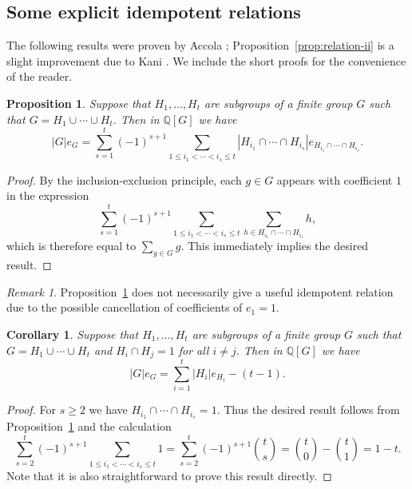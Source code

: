 \documentclass[12pt]{amsart}
\theoremstyle{plain}
\newtheorem{corollary}[theorem]{Corollary}
\newtheorem{prop}[theorem]{Proposition}
\theoremstyle{remark}
\newtheorem{remark}[theorem]{Remark}
\theoremstyle{definition}
\newcommand{\Q}{\mathbb{Q}}
\numberwithin{equation}{section}
\begin{document}
\subsection{Some explicit idempotent relations}\label{subsec:explicit-ir}
The following results were proven by Accola \cite{MR0259105};
Proposition~\ref{prop:relation-ii} is a slight improvement due to Kani \cite[\S 3]{MR790953}.
We include the short proofs for the convenience of the reader. 

\begin{prop}\cite{MR0259105}\label{prop:relation-i}
Suppose that $H_{1},\ldots,H_{t}$ are subgroups of a finite group $G$ such that 
$G=H_{1}\cup \cdots \cup H_{t}$. Then in $\Q[G]$ we have
\[
|G|e_{G}
=
\sum_{s=1}^t(-1)^{s+1}
\sum_{1\leq i_{1} < \cdots < i_{s} \leq t}
|H_{i_{1}}\cap \cdots \cap H_{i_{s}}| e_{H_{i_{1}}\cap \cdots \cap H_{i_{s}}}.
\]
\end{prop}

\begin{proof}
By the inclusion-exclusion principle, each $g\in G$ appears with coefficient $1$ in the expression
\[
\sum_{s=1}^t(-1)^{s+1}\sum_{1\leq i_1<\cdots< i_s\leq t}\sum_{h\in H_{i_1}\cap\cdots\cap H_{i_s}}h,
\]
which is therefore equal to $\sum_{g\in G}g$. This immediately implies the desired result.
\end{proof}

\begin{remark}
Proposition~\ref{prop:relation-i} does not necessarily give a useful idempotent 
relation due to the possible cancellation of coefficients of $e_{1}=1$.
\end{remark}

\begin{corollary}\label{cor:relation-trivial-intersection}
Suppose that $H_{1},\ldots,H_{t}$ are subgroups of a finite group $G$ such that 
$G=H_{1}\cup \cdots \cup H_{t}$ and $H_{i} \cap H_{j} = 1$ for all $i \neq j$. 
Then in $\Q[G]$ we have 
\[
|G|e_{G}
=
\sum_{i=1}^{t} |H_{i}|e_{H_{i}} - (t-1).
\]
\end{corollary}

\begin{proof}
For $s \geq 2$ we have $H_{i_{1}} \cap \cdots \cap H_{i_{s}} =1$.
Thus the desired result follows from Proposition~\ref{prop:relation-i} and the calculation
\[
\sum_{s=2}^{t}(-1)^{s+1}
\sum_{1\leq i_{1} < \cdots < i_{s} \leq t} 1 
= \sum_{s=2}^{t}(-1)^{s+1} { t \choose s} 
= { t \choose 0} - {t \choose 1} 
= 1-t.
\] 
Note that it is also straightforward to prove this result directly.
\end{proof}
\end{document}
